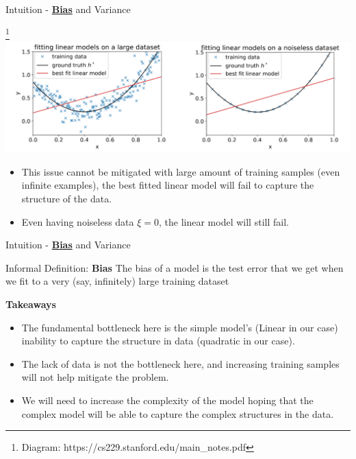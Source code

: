 \documentclass{beamer}
\begin{document}
\begin{frame}{Intuition - \underline{\textbf{Bias}} and Variance}
    \begin{center}
                \scriptsize{\footnote{\tiny{Diagram: https://cs229.stanford.edu/main\_notes.pdf}}}
        \includegraphics[width=\linewidth]{images/biasvar/biasLargeAndNoiseless.png}
    \end{center}
    \begin{itemize}
        \item This issue cannot be mitigated with  large amount of training samples (even infinite examples), the best fitted linear model will fail to capture the structure of the data.
        \item Even having noiseless data $\xi = 0$, the linear model will still fail.
    \end{itemize}
\end{frame}

\begin{frame}{Intuition - \underline{\textbf{Bias}} and Variance}
    \begin{block}{Informal Definition: \textbf{Bias}}
        The bias of a model is the test error that we get when we fit to a very (say, infinitely) large training dataset
    \end{block}

    \textbf{Takeaways}
    
    \begin{itemize}
        \item The fundamental bottleneck here is the simple model's (Linear in our case) inability to capture the structure in data (quadratic in our case).
        \item The lack of data is not the bottleneck here, and increasing training samples will not help mitigate the problem.
        \item We will need to increase the complexity of the model hoping that the complex model will be able to capture the complex structures in the data.
    \end{itemize}
\end{frame}
\end{document}
